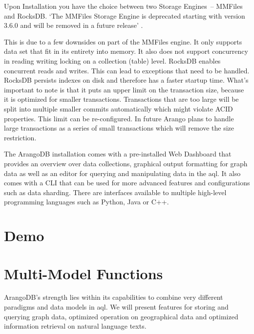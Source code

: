 Upon Installation you have the choice between two Storage Engines – MMFiles and RocksDB. `The MMFiles Storage Engine is deprecated starting with version 3.6.0 and will be removed in a future release' \cite{ArangoDeprecated}.

This is due to a few downsides on part of the MMFiles engine. It only supports data set that fit in its entirety into memory. It also does not support concurrency in reading writing locking on a collection (table) level. RocksDB enables concurrent reads and writes. This can lead to exceptions that need to be handled. RocksDB persists indexes on disk and therefore has a faster startup time. What's important to note is that it puts an upper limit on the transaction size, because it is optimized for smaller transactions. Transactions that are too large will be split into multiple smaller commits automatically which might violate ACID properties. This limit can be re-configured. In future Arango plans to handle large transactions as a series of small transactions which will remove the size restriction. \cite{MMvsRocks}

The ArangoDB installation comes with a pre-installed Web Dashboard that provides an overview over data collections, graphical output formatting for graph data as well as an editor for querying and manipulating data in the \gls{aql}. It also comes with a CLI that can be used for more advanced features and configurations such as data sharding. There are interfaces available to multiple high-level programming languages such as Python, Java or C++. 

\section{Demo}

\section{Multi-Model Functions}

ArangoDB's strength lies within its capabilities to combine very different paradigms and data models in \gls{aql}. We will present features for storing and querying graph data, optimized operation on geographical data and optimized information retrieval on natural language texts.


